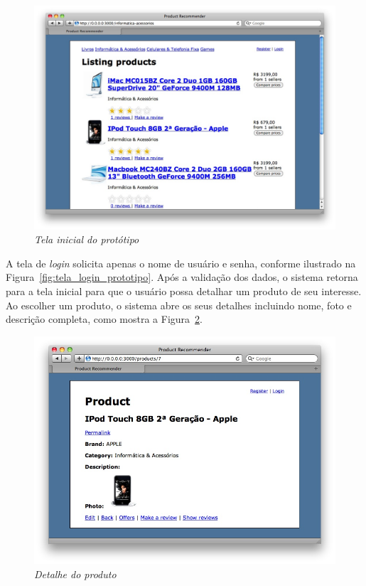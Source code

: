 \begin{figure}
  \centering
  \includegraphics[width=\textwidth]{imagens/Tela_Inicial_Prototipo}
  \caption{\it Tela inicial do protótipo}
  \label{fig:tela_inicial_prototipo}
\end{figure}

 A tela de \textit{login} solicita apenas o nome de usuário e senha, conforme ilustrado na Figura~\ref{fig:tela_login_prototipo}. Após a validação dos dados, o sistema retorna para a tela inicial para que o usuário possa detalhar um produto de seu interesse. Ao escolher um produto, o sistema abre os seus detalhes incluindo nome, foto e descrição completa, como mostra a Figura~\ref{fig:detalhe_produto_prototipo}.

\begin{figure}
  \centering
  \includegraphics[width=\textwidth]{imagens/Detalhe_Produto_Prototipo}
  \caption{\it Detalhe do produto}
  \label{fig:detalhe_produto_prototipo}
\end{figure}